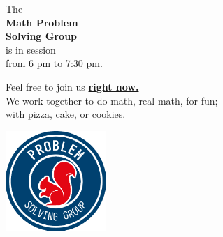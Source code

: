 \documentclass[20pt]{beamer}
\begin{document}
\color{white}
\begin{frame}
	\begin{center}
		\vspace{.6in}

		{\LARGE The} \\[4mm]
		{\Huge \textbf{Math Problem}} \\[4mm]
		{\Huge \textbf{Solving Group}} \\[4mm]
		{\LARGE is in session} \\[4mm]
		{\large from 6 pm to 7:30 pm.}

		
		\vfill

		{\Large Feel free to join us \underline{\textbf{right now.}}} \\ 
		We work together to do math, real math, for fun;\\
		with pizza, cake, or cookies. \\[1em]


		\vspace{.3in}

		\includegraphics[width = 1.5in]{psg_logo}
	\end{center}
\end{frame}
\end{document}
